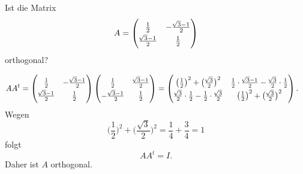 Ist die Matrix
\[
A
=
\renewcommand{\arraystretch}{1.4}
\begin{pmatrix*}
\frac12              & -\frac{\!\sqrt{3}-1}2 \\
\frac{\!\sqrt{3}-1}2 &  \frac12
\\
\end{pmatrix*}
\]
orthogonal?

\begin{loesung}
\begin{align*}
AA^t
&=
\renewcommand{\arraystretch}{1.4}
\begin{pmatrix*}
\frac12              & -\frac{\!\sqrt{3}-1}2 \\
\frac{\!\sqrt{3}-1}2 &  \frac12
\end{pmatrix*}
\begin{pmatrix*}
 \frac12              &  \frac{\!\sqrt{3}-1}2 \\
-\frac{\!\sqrt{3}-1}2 &  \frac12
\end{pmatrix*}
=
\begin{pmatrix*}
\bigl(\frac{1}{2}\bigr)^2
+
\bigl(\frac{\!\sqrt{3}}2\bigr)^2
&
\frac12\cdot\frac{\!\sqrt{3}-1}2
-
\frac{\!\sqrt{3}}2 \cdot \frac12
\\
\frac{\!\sqrt{3}}2 \cdot \frac12
-
\frac12\cdot\frac{\!\sqrt{3}}2
&
\bigl(\frac{1}{2}\bigr)^2
+
\bigl(\frac{\!\sqrt{3}}2\bigr)^2
\end{pmatrix*}.
\end{align*}
Wegen
\[
\biggl(\frac{1}{2}\biggr)^2
+
\biggl(\frac{\!\sqrt{3}}2\biggr)^2
=
\frac14 + \frac34
=
1
\]
folgt
\[
AA^t
=
I.
\]
Daher ist $A$ orthogonal.
\end{loesung}



